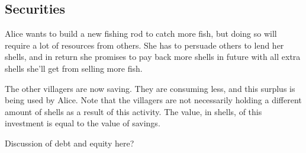 
\subsection{Securities}

Alice wants to build a new fishing rod to catch more fish, but doing so will require a lot of resources from others. She has to persuade others to lend her shells, and in return she promises to pay back more shells in future with all extra shells she’ll get from selling more fish.

The other villagers are now saving. They are consuming less, and this surplus is being used by Alice. Note that the villagers are not necessarily holding a different amount of shells as a result of this activity. The value, in shells, of this investment is equal to the value of savings.

Discussion of debt and equity here?

